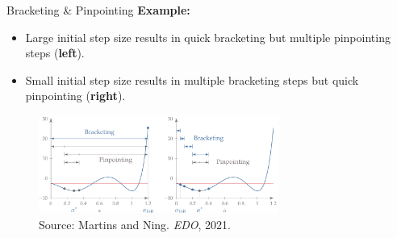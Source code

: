 \documentclass[11pt,compress,t,notes=noshow, xcolor=table]{beamer}
\begin{document}
    \begin{vbframe}{Bracketing \& Pinpointing}
        \textbf{Example:}
        \begin{itemize}
            \item Large initial step size results in quick bracketing but multiple pinpointing steps (\textbf{left}).
            \item Small initial step size results in multiple bracketing steps but quick pinpointing (\textbf{right}).
        \end{itemize}
        \begin{figure}
            \centering
            \includegraphics[width=0.7\textwidth]{figure_man/bracketing-pinpointing-example.png}
            \caption*{Source: Martins and Ning. \textit{EDO}, 2021.}
        \end{figure}
    \end{vbframe}

	
	

    
	\endlecture
\end{document}
